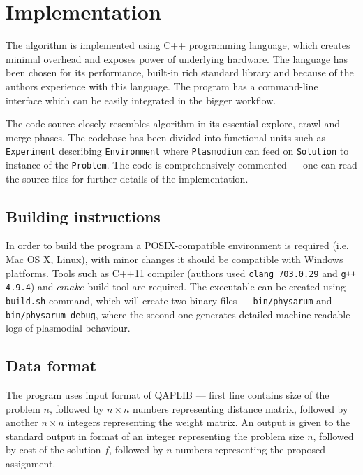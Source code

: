 \section{Implementation}
\label{section:project_implementation}

The algorithm is implemented using C++ programming language, which creates minimal overhead and exposes power of underlying hardware. The language has been chosen for its performance, built-in rich standard library and because of the authors experience with this language. The program has a command-line interface which can be easily integrated in the bigger workflow.

The code source closely resembles algorithm in its essential explore, crawl and merge phases. The codebase has been divided into functional units such as \texttt{Experiment} describing \texttt{Environment} where \texttt{Plasmodium} can feed on \texttt{Solution} to instance of the \texttt{Problem}. The code is comprehensively commented --- one can read the source files for further details of the implementation.

\subsection{Building instructions}

In order to build the program a POSIX-compatible environment is required (i.e. Mac OS X, Linux), with minor changes it should be compatible with Windows platforms. Tools such as C++11 compiler (authors used \texttt{clang 703.0.29} and \texttt{g++ 4.9.4}) and $cmake$ build tool are required. The executable can be created using \texttt{build.sh} command, which will create two binary files --- \texttt{bin/physarum} and \texttt{bin/physarum-debug}, where the second one generates detailed machine readable logs of plasmodial behaviour.

\subsection{Data format}

The program uses input format of QAPLIB \cite{burkard1997qaplib} --- first line contains size of the problem $n$, followed by $n{\times}n$ numbers representing distance matrix, followed by another $n{\times}n$ integers representing the weight matrix. An output is given to the standard output in format of an integer representing the problem size $n$, followed by cost of the solution $f$, followed by $n$ numbers representing the proposed assignment.

